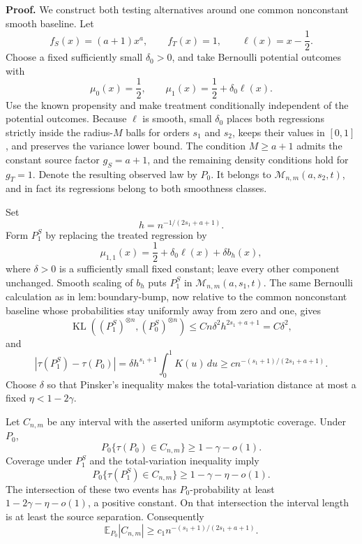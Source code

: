 \textbf{Proof.}
We construct both testing alternatives around one common nonconstant smooth baseline.  Let
\[
 f_S(x)=(a+1)x^a,
 \qquad
 f_T(x)=1,
 \qquad
 \ell(x)=x-\frac12.
\]
Choose a fixed sufficiently small \(\delta_0>0\), and take Bernoulli potential outcomes with
\[
 \mu_0(x)=\frac12,
 \qquad
 \mu_1(x)=\frac12+\delta_0\ell(x).
\]
Use the known propensity and make treatment conditionally independent of the potential outcomes.  Because \(\ell\) is smooth, small \(\delta_0\) places both regressions strictly inside the radius-\(M\) balls for orders \(s_1\) and \(s_2\), keeps their values in \([0,1]\), and preserves the variance lower bound.  The condition \(M\ge a+1\) admits the constant source factor \(g_S=a+1\), and the remaining density conditions hold for \(g_T=1\).  Denote the resulting observed law by \(P_0\).  It belongs to \(\mathcal M_{n,m}(a,s_2,t)\), and in fact its regressions belong to both smoothness classes.

Set
\[
 h=n^{-1/(2s_1+a+1)}.
\]
Form \(P_1^S\) by replacing the treated regression by
\[
 \mu_{1,1}(x)=\frac12+\delta_0\ell(x)+\delta b_h(x),
\]
where \(\delta>0\) is a sufficiently small fixed constant; leave every other component unchanged.  Smooth scaling of \(b_h\) puts \(P_1^S\) in \(\mathcal M_{n,m}(a,s_1,t)\).  The same Bernoulli calculation as in \(\mathrm{lem:boundary\text{-}bump}\), now relative to the common nonconstant baseline whose probabilities stay uniformly away from zero and one, gives
\[
 \operatorname{KL}((P_1^S)^{\otimes n},(P_0^S)^{\otimes n})
 \le Cn\delta^2h^{2s_1+a+1}
 =C\delta^2,
\]
and
\[
 |\tau(P_1^S)-\tau(P_0)|
 =\delta h^{s_1+1}\int_0^1K(u)\,du
 \ge c n^{-(s_1+1)/(2s_1+a+1)}.
\]
Choose \(\delta\) so that Pinsker's inequality makes the total-variation distance at most a fixed \(\eta<1-2\gamma\).

Let \(C_{n,m}\) be any interval with the asserted uniform asymptotic coverage.  Under \(P_0\),
\[
 P_0\{\tau(P_0)\in C_{n,m}\}\ge1-\gamma-o(1).
\]
Coverage under \(P_1^S\) and the total-variation inequality imply
\[
 P_0\{\tau(P_1^S)\in C_{n,m}\}
 \ge1-\gamma-\eta-o(1).
\]
The intersection of these two events has \(P_0\)-probability at least \(1-2\gamma-\eta-o(1)\), a positive constant.  On that intersection the interval length is at least the source separation.  Consequently
\[
 \mathbb E_{P_0}|C_{n,m}|
 \ge c_1n^{-(s_1+1)/(2s_1+a+1)}.
\]

